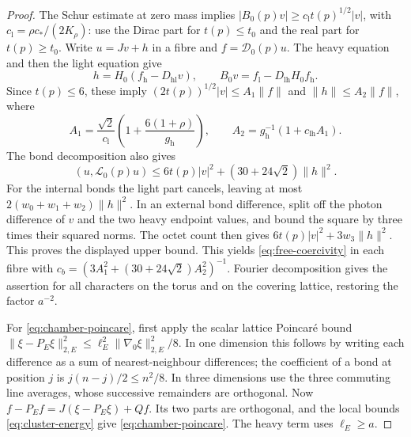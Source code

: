 \begin{proof}
The Schur estimate at zero mass implies
$|B_0(p)v|\ge c_{\mathrm l}t(p)^{1/2}|v|$, with
$c_{\mathrm l}=\rho c_*/(2K_\rho)$: use the Dirac part for
$t(p)\le t_0$ and the real part for $t(p)\ge t_0$.
Write $u=Jv+h$ in a fibre and $f=\mathcal D_0(p)u$. The heavy equation
and then the light equation give
\[
 h=H_0(f_{\mathrm h}-D_{\mathrm{hl}}v),\qquad
 B_0v=f_{\mathrm l}-D_{\mathrm{lh}}H_0f_{\mathrm h}.
\]
Since $t(p)\le6$, these imply
$(2t(p))^{1/2}|v|\le A_1\|f\|$ and $\|h\|\le A_2\|f\|$, where
\[
 A_1=\frac{\sqrt2}{c_{\mathrm l}}
         \left(1+\frac{6(1+\rho)}{g_{\mathrm h}}\right),\qquad
 A_2=g_{\mathrm h}^{-1}(1+c_{\mathrm{lh}}A_1).
\]
The bond decomposition also gives
\[
 (u,\mathcal L_0(p)u)\le6t(p)|v|^2+(30+24\sqrt2)\|h\|^2.
\]
For the internal bonds the light part cancels, leaving at most
$2(w_0+w_1+w_2)\|h\|^2$. In an external bond difference, split off
the photon difference of $v$ and the two heavy endpoint values, and
bound the square by three times their squared norms. The octet count
then gives $6t(p)|v|^2+3w_3\|h\|^2$. This proves the displayed
upper bound.
This yields \eqref{eq:free-coercivity} in each fibre with
$c_b=(3A_1^2+(30+24\sqrt2)A_2^2)^{-1}$.
Fourier decomposition gives the assertion for all characters on the
torus and on the covering lattice, restoring the factor $a^{-2}$.

For \eqref{eq:chamber-poincare}, first apply the scalar lattice
Poincar\'e bound
$\|\xi-P_E\xi\|_{2,E}^2\le\ell_E^2\|\nabla_0\xi\|_{2,E}^2/8$.
In one dimension this follows by writing each difference as a sum of
nearest-neighbour differences; the coefficient of a bond at position
$j$ is $j(n-j)/2\le n^2/8$. In three dimensions use the three commuting
line averages, whose successive remainders are orthogonal.
Now $f-P_Ef=J(\xi-P_E\xi)+Qf$. Its two parts are orthogonal, and the
local bounds \eqref{eq:cluster-energy} give
\eqref{eq:chamber-poincare}. The heavy term uses $\ell_E\ge a$.
\end{proof}

